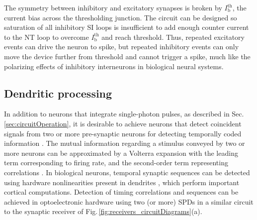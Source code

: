 \documentclass[twocolumn]{article}
\begin{document}
The symmetry between inhibitory and excitatory synapses is broken by $I_{\mathrm{b}}^{\mathrm{th}}$, the current bias across the thresholding junction. The circuit can be designed so saturation of all inhibitory SI loops is insufficient to add enough counter current to the NT loop to overcome  $I_{\mathrm{b}}^{\mathrm{th}}$ and reach threshold. Thus, repeated excitatory events can drive the neuron to spike, but repeated inhibitory events can only move the device further from threshold and cannot trigger a spike, much like the polarizing effects of inhibitory interneurons in biological neural systems.
	
\subsection{\label{sec:dendriticProcessing}Dendritic processing}
In addition to neurons that integrate single-photon pulses, as described in Sec. \ref{sec:circuitOperation}, it is desirable to achieve neurons that detect coincident signals from two or more pre-synaptic neurons for detecting temporally coded information \cite{thde2001,sase2001,stse2007,sp2008,brcl2010,haah2015}. The mutual information regarding a stimulus conveyed by two or more neurons can be approximated by a Volterra expansion \cite{geki2002} with the leading term corresponding to firing rate, and the second-order term representing correlations \cite{pasc1999}. In biological neurons, temporal synaptic sequences can be detected using hardware nonlinearities present in dendrites \cite{brcl2010,haah2015}, which perform important cortical computations. Detection of timing correlations and sequences can be achieved in optoelectronic hardware using two (or more) SPDs in a similar circuit to the synaptic receiver of Fig.\,\ref{fig:receivers_circuitDiagrams}(a). 
\end{document}
